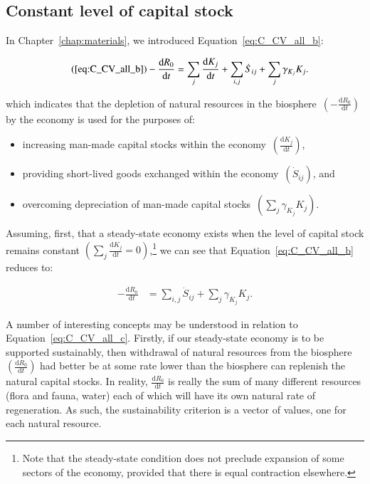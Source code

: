 \subsection{Constant level of capital stock}

In Chapter~\ref{chap:materials}, 
we introduced Equation~\ref{eq:C_CV_all_b}:

\begin{align}\tag{\ref{eq:C_CV_all_b}}
	- \frac{\mathrm{d}R_{0}}{\mathrm{d}t}										&
	=\sum_{j}\frac{\mathrm{d}K_{j}}{\mathrm{d}t}
	+ \sum_{i,j}\dot{S}_{ij}
	+ \sum_{j}\gamma_{K_{j}}K_{j}.
\end{align}

\noindent{}which indicates that 
the depletion of natural resources in the 
biosphere~$\left(- \frac{\mathrm{d}R_{0}}{\mathrm{d}t}\right)$
by the economy
is used for the purposes of:

\begin{itemize}
	\item{increasing man-made capital stocks
	within the economy~$\left(\frac{\mathrm{d}K_{j}}{\mathrm{d}t}\right)$,}
	\item{providing short-lived goods exchanged within the
	economy~$\left(\dot{S}_{ij}\right)$, and}
	\item{overcoming depreciation of man-made
	capital stocks~$\left(\sum_{j}\gamma_{K_{j}}K_{j}\right)$.}
\end{itemize}

Assuming,
first,
that a steady-state economy exists when the level
of capital stock remains constant
$\left(\sum_{j}\frac{\mathrm{d}K_{j}}{\mathrm{d}t}=0\right)$,\footnote{Note
that the steady-state condition does not preclude expansion
of some sectors of the economy, provided that there is 
equal contraction elsewhere.}
we can see that Equation~\ref{eq:C_CV_all_b}
reduces to:

\begin{align}\label{eq:C_CV_all_c}
	- \frac{\mathrm{d}R_{0}}{\mathrm{d}t}										&
	= \sum_{i,j}\dot{S}_{ij}
	+ \sum_{j}\gamma_{K_{j}}K_{j}.
\end{align}

A number of interesting concepts may be understood in
relation to Equation~\ref{eq:C_CV_all_c}. 
Firstly,
if our steady-state economy is to be supported
sustainably,
then withdrawal of natural resources from the biosphere
$\left(\frac{\mathrm{d}R_{0}}{\mathrm{d}t}\right)$
had better be at some rate lower than the biosphere
can replenish the natural capital stocks. 
In reality, 
$\frac{\mathrm{d}R_{0}}{\mathrm{d}t}$
is really the sum of many different resources
(flora and fauna, water) each of which will have
its own natural rate of regeneration.
As such, 
the sustainability criterion  is a vector of values,
one for each natural resource.

